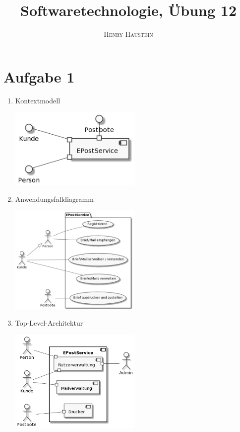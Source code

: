 \documentclass{article}
\title{\textbf{Softwaretechnologie, Übung 12}}
\author{\textsc{Henry Haustein}}
\date{}
\begin{document}
	\maketitle
	
	\section*{Aufgabe 1}
	\begin{enumerate}[label=(\alph*)]
		\item Kontextmodell
		\begin{center}
			\includegraphics[width=0.50\textwidth]{./Aufgabe12_1a}
		\end{center}
		\item Anwendungsfalldiagramm
		\begin{center}
			\includegraphics[width=0.50\textwidth]{./Aufgabe12_1b}
		\end{center}
		\item Top-Level-Architektur
		\begin{center}
			\includegraphics[width=0.50\textwidth]{./Aufgabe12_1c}
		\end{center}
	\end{enumerate}
\end{document}
